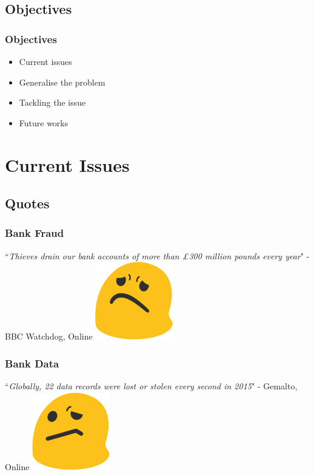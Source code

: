 \documentclass{beamer}
\begin{document}
    \subsection{Objectives}
      \begin{frame}
        \frametitle{Objectives}
        \begin{itemize}
          \item Current issues
          \item Generalise the problem
          \item Tackling the issue
          \item Future works
        \end{itemize}
      \end{frame}
  \section{Current Issues}
    \subsection{Quotes}
      \begin{frame}
        \frametitle{Bank Fraud}
        ``\emph{Thieves drain our bank accounts of more than £300 million pounds
        every year}" - BBC Watchdog, Online \cite{BBCFraud}
        \vfill
        \hfill
        \includegraphics[scale=0.25]{worried}\cite{WikiCommonsEmoji}
      \end{frame}
      \begin{frame}
        \frametitle{Bank Data}
        ``\emph{Globally, 22 data records were lost or stolen every second in
        2015}" - Gemalto, Online \cite{Gemalto}
        \vfill
        \hfill
        \includegraphics[scale=0.25]{confused}\cite{WikiCommonsEmoji}
      \end{frame}
\end{document}

